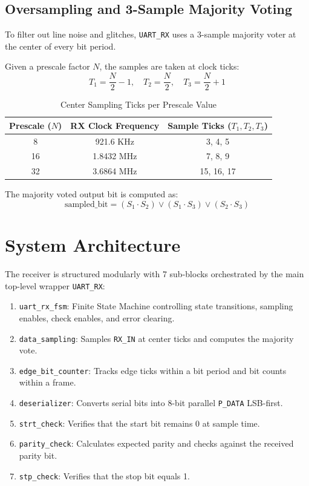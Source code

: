 \documentclass[12pt,a4paper]{article}
\begin{document}
\subsection{Oversampling and 3-Sample Majority Voting}

To filter out line noise and glitches, \texttt{UART\_RX} uses a 3-sample majority voter at the center of every bit period.

Given a prescale factor $N$, the samples are taken at clock ticks:
\[
T_1 = \frac{N}{2} - 1, \quad T_2 = \frac{N}{2}, \quad T_3 = \frac{N}{2} + 1
\]

\begin{table}[H]
\centering
\caption{Center Sampling Ticks per Prescale Value}
\begin{tabular}{ccc}
\toprule
\textbf{Prescale ($N$)} & \textbf{RX Clock Frequency} & \textbf{Sample Ticks ($T_1, T_2, T_3$)} \\
\midrule
8  & 921.6 KHz  & 3, 4, 5 \\
16 & 1.8432 MHz & 7, 8, 9 \\
32 & 3.6864 MHz & 15, 16, 17 \\
\bottomrule
\end{tabular}
\end{table}

The majority voted output bit is computed as:
\[
\text{sampled\_bit} = (S_1 \cdot S_2) \lor (S_1 \cdot S_3) \lor (S_2 \cdot S_3)
\]

\section{System Architecture}

The receiver is structured modularly with 7 sub-blocks orchestrated by the main top-level wrapper \texttt{UART\_RX}:

\begin{enumerate}
    \item \texttt{uart\_rx\_fsm}: Finite State Machine controlling state transitions, sampling enables, check enables, and error clearing.
    \item \texttt{data\_sampling}: Samples \texttt{RX\_IN} at center ticks and computes the majority vote.
    \item \texttt{edge\_bit\_counter}: Tracks edge ticks within a bit period and bit counts within a frame.
    \item \texttt{deserializer}: Converts serial bits into 8-bit parallel \texttt{P\_DATA} LSB-first.
    \item \texttt{strt\_check}: Verifies that the start bit remains 0 at sample time.
    \item \texttt{parity\_check}: Calculates expected parity and checks against the received parity bit.
    \item \texttt{stp\_check}: Verifies that the stop bit equals 1.
\end{enumerate}
\end{document}
